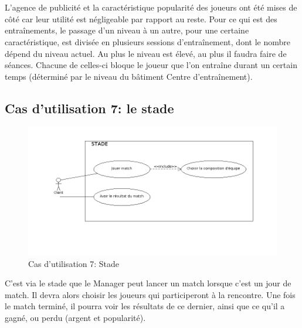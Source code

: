 \documentclass[a4paper,titlepage]{scrreprt}
\begin{document}
\\\\L'agence de publicité et la caractéristique popularité des joueurs ont été mises de côté car leur utilité est négligeable par rapport au reste. Pour ce qui est des entraînements, le passage d'un niveau à un autre, pour une certaine caractéristique, est divisée en plusieurs sessions d'entraînement, dont le nombre dépend du niveau actuel. Au plus le niveau est élevé, au plus il faudra faire de séances. Chacune de celles-ci bloque le joueur que l'on entraîne durant un certain temps (déterminé par le niveau du bâtiment Centre d'entraînement). 

  \subsection{Cas d'utilisation 7: le stade}
  \begin{figure}[H]
    \center
    \includegraphics[scale=0.5]{uml/useCaseView/Stade.png}
    \caption{Cas d'utilisation 7: Stade}
  \end{figure}
  C'est via le \gls{stade}  que le Manager peut lancer un match lorsque c'est un jour de match. Il devra alors choisir les joueurs qui participeront à la rencontre. Une fois le match terminé, il pourra voir les résultats de ce dernier, ainsi que ce qu'il a gagné, ou perdu (argent et popularité).
\end{document}
